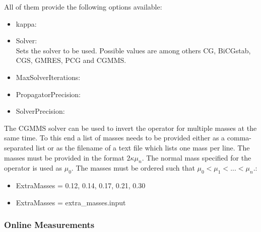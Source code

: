 All of them provide the following options available:
\begin{itemize}
\item {\ttfamily kappa}:
\item {\ttfamily Solver}:\\
  Sets the solver to be used. Possible values are among others
  {\ttfamily CG, BiCGstab, CGS, GMRES, PCG and CGMMS}.
\item {\ttfamily MaxSolverIterations}:
\item {\ttfamily PropagatorPrecision}:
\item {\ttfamily SolverPrecision}:
\end{itemize}

The {\ttfamily CGMMS} solver can be used to invert the operator for 
multiple masses at the same time. To this end a list of masses needs
to be provided either as a comma-separated list or as the filename of a
text file which lists one mass per line. The masses must be provided in the
format $2 \kappa \mu_n$. The normal mass specified for the operator is
used as $\mu_0$. The masses must be ordered such that $\mu_0 < \mu_1 < ... < \mu_n$.:

\begin{itemize}
  \item{ {\ttfamily ExtraMasses = 0.12, 0.14, 0.17, 0.21, 0.30} }
  \item{ {\ttfamily ExtraMasses = extra\_masses.input } }	
\end{itemize} 

\subsubsection{Online Measurements}

